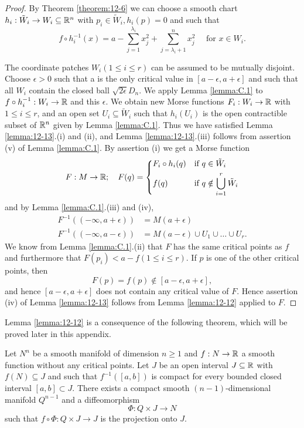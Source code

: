\begingroup 
\def\proofname{\textup{\bfseries Proof of Lemma \ref{lemma:12-13}}}
\begin{proof}
  By Theorem \ref{theorem:12-6} we can choose a smooth chart $h_i:\tilde{W}_i\to W_i\subseteq{\ensuremath{\mathbb{R}}}^n$ 
  with $p_i\in \tilde{W}_i, h_i(p)=0$ and such that 
  \[
    f\circ h_i^{-1}(x) 
    = a - \sum_{j=1}^{\lambda_i} x_j^2 + \sum_{j=\lambda_i+1}^{n }{x_j^2} 
    \quad \text{ for } x\in W_i.
  \]

  The coordinate patches $W_i(1\le i\le r)$ can be assumed to be mutually disjoint.
  Choose $\epsilon > 0$ such that a is the only critical value in $[a-\epsilon, a + \epsilon]$ and 
  such that all $W_i$ contain the closed ball $\sqrt{2\epsilon}D_n$. We apply Lemma \ref{lemma:C.1} 
  to $f\circ h_i^{-1}:W_i\to{\ensuremath{\mathbb{R}}}$ and this $\epsilon$. We obtain new Morse functions $F_i:W_i\to{\ensuremath{\mathbb{R}}}$ with $1\le i\le r$,
  and an open set $U_i\subseteq \tilde{W}_i$ such that $h_i(U_i)$ is the open contractible subset of
  ${\mathbb{R}}^n$ given by Lemma \ref{lemma:C.1}. Thus we have satisfied Lemma \ref{lemma:12-13}.(i) and (ii), and
  Lemma \ref{lemma:12-13}.(iii) follows from assertion (v) of Lemma \ref{lemma:C.1}. By assertion (i) we
  get a Morse function
  \[
    F:M\to {\ensuremath{\mathbb{R}}};\quad 
    F(q) = \left\{\begin{aligned}
      & F_i\circ h_i(q) && \text{if } q\in \tilde{W}_i\\
      & f(q) && \text{if } q\notin\bigcup_{i=1}^{r}{\tilde{W}_i}
    \end{aligned}\right.
  \]
  and by Lemma \ref{lemma:C.1}.(iii) and (iv),
  \begin{align*}
    F^{-1}((-\infty, a+\epsilon)) & = M(a+\epsilon)\\
    F^{-1}((-\infty, a-\epsilon)) & = M(a-\epsilon) \cup U_1\cup\ldots\cup U_r.
  \end{align*}
  We know from Lemma \ref{lemma:C.1}.(ii) that $F$ has the same critical points as $f$ and
  furthermore that $F(p_i) < a-f (1\le i\le r)$. If $p$ is one of the other critical
  points, then
  \[
    F(p) = f(p) \notin [a-\epsilon, a+\epsilon],
  \]
  and hence $[a-\epsilon, a+\epsilon]$ does not contain any critical value of $F$. Hence assertion (iv)
  of Lemma \ref{lemma:12-13} follows from Lemma \ref{lemma:12-12} applied to $F$.
\end{proof}
\endgroup

Lemma \ref{lemma:12-12} is a consequence of the following theorem, which will be proved
later in this appendix.

\begin{theorem}\label{theorem:C.2}
  Let $N^n$ be a smooth manifold of dimension $n\ge 1$ and $f:N\to{\ensuremath{\mathbb{R}}}$
  a smooth function without any critical points. Let $J$ be an open interval $J\subseteq{\ensuremath{\mathbb{R}}}$
  with $f(N)\subseteq J$ and such that $f^{-1}([a, b])$ is compact for every bounded closed
  interval $[a, b]\subset J$. There exists a compact smooth $(n-1)$-dimensional manifold
  $Q^{n-1}$ and a diffeomorphism
  \[
    \Phi:Q\times J\to N
  \]
  such that $f\circ \Phi:Q\times J\to J$ is the projection onto $J$.
\end{theorem}

